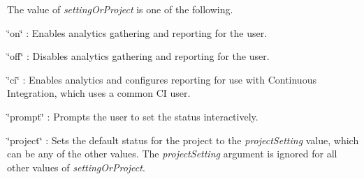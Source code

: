 The value of {\itshape setting\+Or\+Project} is one of the following.


\begin{DoxyItemize}
\item \char`\"{}on\char`\"{} \+: Enables analytics gathering and reporting for the user.
\item \char`\"{}off\char`\"{} \+: Disables analytics gathering and reporting for the user.
\item \char`\"{}ci\char`\"{} \+: Enables analytics and configures reporting for use with Continuous Integration, which uses a common CI user.
\item \char`\"{}prompt\char`\"{} \+: Prompts the user to set the status interactively.
\item \char`\"{}project\char`\"{} \+: Sets the default status for the project to the {\itshape project\+Setting} value, which can be any of the other values. The {\itshape project\+Setting} argument is ignored for all other values of {\itshape setting\+Or\+Project}. 
\end{DoxyItemize}